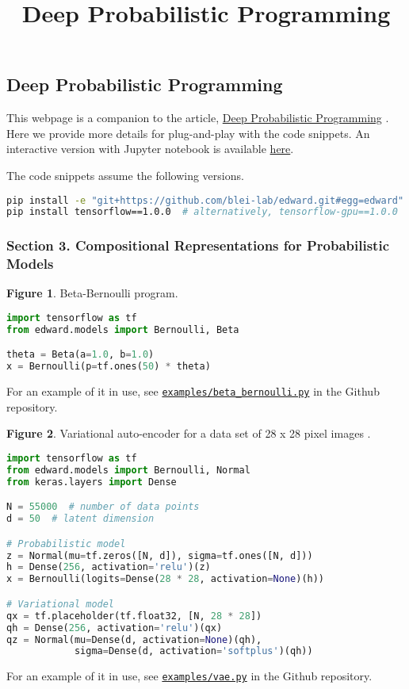 \title{Deep Probabilistic Programming}

\subsection{Deep Probabilistic Programming}

This webpage is a companion to the article,
\href{https://arxiv.org/abs/1701.03757}{Deep Probabilistic Programming}
\citep{tran2017deep}.
Here we provide more details for plug-and-play with the code snippets.
An interactive version with Jupyter notebook is available
\href{http://nbviewer.jupyter.org/github/blei-lab/edward/blob/master/docs/notebooks/iclr2017.ipynb}{here}.

The code snippets assume the following versions.

\begin{lstlisting}[language=bash]
pip install -e "git+https://github.com/blei-lab/edward.git#egg=edward"
pip install tensorflow==1.0.0  # alternatively, tensorflow-gpu==1.0.0
\end{lstlisting}

\subsubsection{Section 3. Compositional Representations for Probabilistic Models}

\textbf{Figure 1}. Beta-Bernoulli program.
\begin{lstlisting}[language=python]
import tensorflow as tf
from edward.models import Bernoulli, Beta

theta = Beta(a=1.0, b=1.0)
x = Bernoulli(p=tf.ones(50) * theta)
\end{lstlisting}
For an example of it in use, see
\href{https://github.com/blei-lab/edward/blob/master/examples/beta_bernoulli.py}{\texttt{examples/beta_bernoulli.py}}
in the Github repository.

\textbf{Figure 2}. Variational auto-encoder for a data set of 28 x 28 pixel images
\citep{kingma2014auto,rezende2014stochastic}.
\begin{lstlisting}[language=python]
import tensorflow as tf
from edward.models import Bernoulli, Normal
from keras.layers import Dense

N = 55000  # number of data points
d = 50  # latent dimension

# Probabilistic model
z = Normal(mu=tf.zeros([N, d]), sigma=tf.ones([N, d]))
h = Dense(256, activation='relu')(z)
x = Bernoulli(logits=Dense(28 * 28, activation=None)(h))

# Variational model
qx = tf.placeholder(tf.float32, [N, 28 * 28])
qh = Dense(256, activation='relu')(qx)
qz = Normal(mu=Dense(d, activation=None)(qh),
            sigma=Dense(d, activation='softplus')(qh))
\end{lstlisting}
For an example of it in use, see
\href{https://github.com/blei-lab/edward/blob/master/examples/vae.py}{\texttt{examples/vae.py}}
in the Github repository.

